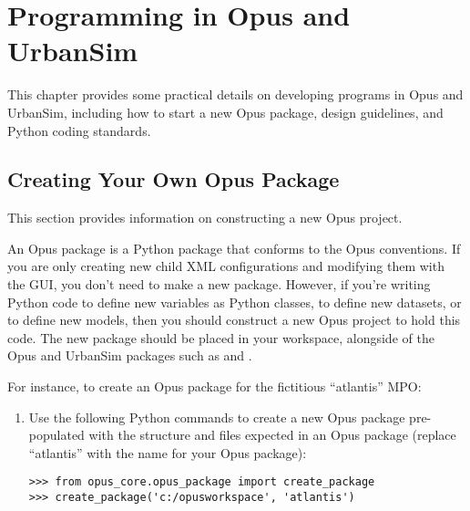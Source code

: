 
\chapter{Programming in Opus and UrbanSim}
\label{chapter:programming}

This chapter provides some practical details on developing programs in Opus
and UrbanSim, including how to start a new Opus package, design guidelines,
and Python coding standards.

\section{Creating Your Own Opus Package}
\label{sec:create-opus-package}

This section provides information on constructing a new Opus project.

An Opus package is a Python package \pythonpackagesindex that conforms to the
Opus conventions.  If you are only creating new child XML configurations and
modifying them with the GUI, you don't need to make a new package.  However, if
you're writing Python code to define new variables as Python classes, to define new 
datasets, or to define new models, then you should construct a new Opus project 
to hold this code.  The new package should be 
placed in your workspace, alongside of the Opus and UrbanSim packages such as 
 and .

For instance, to create an
Opus package for the fictitious ``atlantis'' MPO:

\begin{enumerate}
  \item Use the following Python commands to create a new  Opus
  package pre-populated with the structure and files expected in an Opus package
  (replace ``atlantis'' with the name for your Opus package):
\begin{verbatim}
>>> from opus_core.opus_package import create_package
>>> create_package('c:/opusworkspace', 'atlantis')
\end{verbatim}
\end{enumerate}

